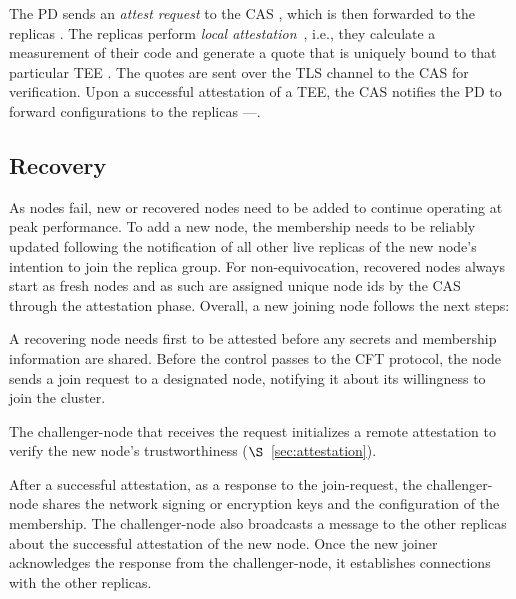 The PD sends an \emph{attest request} to the CAS , which is then forwarded to the replicas . The replicas perform \emph{local attestation}~\cite{Parno2010}, i.e., they calculate a measurement of their code and generate a quote that is uniquely bound to that particular TEE . The quotes are sent over the TLS channel to the CAS for verification. Upon a successful attestation of a TEE, the CAS notifies the PD to forward configurations to the replicas ---.

\subsection{Recovery}
\label{sec:recovery}
As nodes fail, new or recovered nodes need to be added to continue operating at peak performance. To add a new node, the membership needs to be reliably updated following the notification of all other live replicas of the new node’s
intention to join the replica group. For non-equivocation, recovered nodes always
start as fresh nodes and as such are assigned unique node ids by the CAS
through the attestation phase. Overall, a new joining node follows the next steps:


    A recovering node needs first to be attested before any secrets and membership information are shared. Before the control passes to the CFT protocol, the node sends a join request to a designated node, notifying it about its willingness to join the cluster. %
   
    The challenger-node that receives the request initializes a remote attestation to verify the new node's trustworthiness ($\S$~\ref{sec:attestation}). 
   
     After a successful attestation, as a response to the join-request, the challenger-node shares the network signing or encryption keys and the configuration of the membership. The challenger-node also broadcasts a message to the other replicas about the successful attestation of the new node. Once the new joiner acknowledges the response from the challenger-node, it establishes connections with the other replicas. 
    
